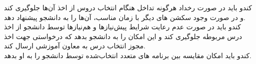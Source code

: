 \documentclass{report}
\begin{document}
\begin{adjustwidth}{2em}{0pt}
                                                                                                                                                                                                                        کندو باید در صورت رخداد هرگونه تداخل هنگام انتخاب دروس از اخذ آن‌ها جلوگیری کند و در صورت وجود سکشن های دیگر با زمان مناسب، آن‌ها را به دانشجو پیشنهاد دهد.                                                                                                                                                                                                                         
\\                                                                                                                                                                                                                        کندو باید در صورت عدم رعایت شرایط پیش‌نیازها و هم‌نیازها توسط دانشجو از اخذ درس مربوطه جلوگیری کند و این امکان را به دانشجو بدهد که درخواستی جهت اخذ مجوز انتخاب درس به معاون آموزشی ارسال کند.
\\                                                                                                                                                                                                                         کندو باید امکان مقایسه بین برنامه های متعدد انتخاب‌شده توسط دانشجو را به او بدهد.

\end{adjustwidth}
\end{document}
